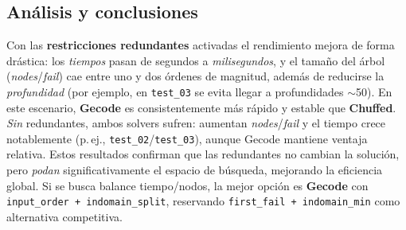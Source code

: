 
\subsection{Análisis y conclusiones}\label{sec:03-secuencia-magica-analisis}

Con las \textbf{restricciones redundantes} activadas el rendimiento mejora de forma drástica: los \emph{tiempos} pasan de segundos a \emph{milisegundos}, y el tamaño del árbol (\textit{nodes}/\textit{fail}) cae entre uno y dos órdenes de magnitud, además de reducirse la \emph{profundidad} (por ejemplo, en \texttt{test\_03} se evita llegar a profundidades $\sim$50). En este escenario, \textbf{Gecode} es consistentemente más rápido y estable que \textbf{Chuffed}. \emph{Sin} redundantes, ambos solvers sufren: aumentan \textit{nodes}/\textit{fail} y el tiempo crece notablemente (p.\,ej., \texttt{test\_02}/\texttt{test\_03}), aunque Gecode mantiene ventaja relativa. Estos resultados confirman que las redundantes no cambian la solución, pero \emph{podan} significativamente el espacio de búsqueda, mejorando la eficiencia global. Si se busca balance tiempo/nodos, la mejor opción es \textbf{Gecode} con \texttt{input\_order + indomain\_split}, reservando \texttt{first\_fail + indomain\_min} como alternativa competitiva.


